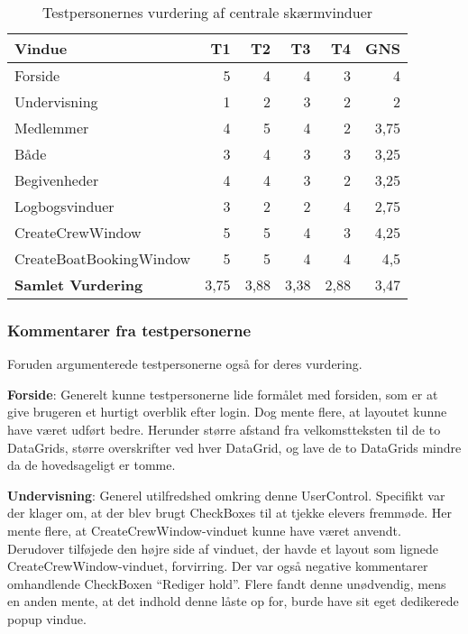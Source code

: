 \begin{table}[htbp]
    \centering
    \caption{Testpersonernes vurdering af centrale skærmvinduer}
    \begin{tabular}{l|rrrr|r}
        \toprule
        \textbf{Vindue} & T1 & T2 & T3 & T4 & \textbf{GNS} \\
        \midrule
        Forside & 5 & 4 & 4 & 3 & 4 \\
        Undervisning & 1 & 2 & 3 & 2 & 2 \\
        Medlemmer & 4 & 5 & 4 & 2 & 3,75 \\
        Både & 3 & 4 & 3 & 3 & 3,25 \\
        Begivenheder & 4 & 4 & 3 & 2 & 3,25 \\
        Logbogsvinduer & 3 & 2 & 2 & 4 & 2,75 \\
        CreateCrewWindow & 5 & 5 & 4 & 3 & 4,25 \\
        CreateBoatBookingWindow & 5 & 5 & 4 & 4 & 4,5 \\ \hline
        \textbf{Samlet Vurdering} & 3,75 & 3,88 & 3,38 & 2,88 & 3,47 \\
    \end{tabular}%
    \label{tab:vurderingtest}%
\end{table}%

\subsubsection*{Kommentarer fra testpersonerne}
Foruden  argumenterede testpersonerne også for deres vurdering.

\textbf{Forside}: 
Generelt kunne testpersonerne lide formålet med forsiden, som er at give brugeren et hurtigt overblik efter login. 
Dog mente flere, at layoutet kunne have været udført bedre.
Herunder større afstand fra velkomstteksten til de to DataGrids, større overskrifter ved hver DataGrid, og lave de to DataGrids mindre da de hovedsageligt er tomme. 

\textbf{Undervisning}: 
Generel utilfredshed omkring denne UserControl.
Specifikt var der klager om, at der blev brugt CheckBoxes til at tjekke elevers fremmøde.
Her mente flere, at CreateCrewWindow-vinduet kunne have været anvendt. 
Derudover tilføjede den højre side af vinduet, der havde et layout som lignede CreateCrewWindow-vinduet, forvirring. 
Der var også negative kommentarer omhandlende CheckBoxen ``Rediger hold''. 
Flere fandt denne unødvendig, mens en anden mente, at det indhold denne låste op for, burde have sit eget dedikerede popup vindue.

